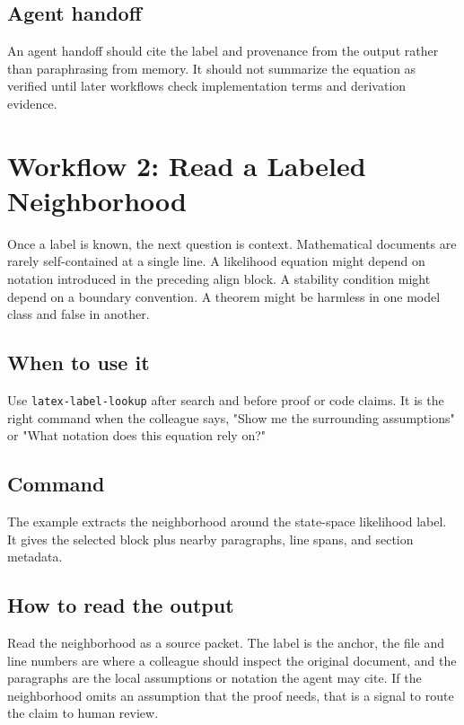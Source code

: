 \documentclass[12pt,a4paper,openany]{book}
\begin{document}
\section*{Agent handoff}

An agent handoff should cite the label and provenance from the output rather
than paraphrasing from memory. It should not summarize the equation as verified
until later workflows check implementation terms and derivation evidence.

\chapter{Workflow 2: Read a Labeled Neighborhood}

Once a label is known, the next question is context. Mathematical documents are
rarely self-contained at a single line. A likelihood equation might depend on
notation introduced in the preceding align block. A stability condition might
depend on a boundary convention. A theorem might be harmless in one model class
and false in another.

\section*{When to use it}

Use \texttt{latex-label-lookup} after search and before proof or code
claims. It is the right command when the colleague says, "Show me the surrounding
assumptions" or "What notation does this equation rely on?"

\section*{Command}

The example extracts the neighborhood around the state-space likelihood label.
It gives the selected block plus nearby paragraphs, line spans, and section
metadata.



\section*{How to read the output}

Read the neighborhood as a source packet. The label is the anchor, the file and
line numbers are where a colleague should inspect the original document, and the
paragraphs are the local assumptions or notation the agent may cite. If the
neighborhood omits an assumption that the proof needs, that is a signal to route
the claim to human review.
\end{document}
